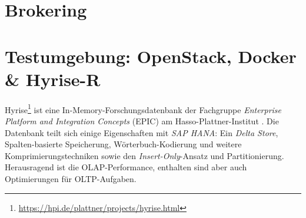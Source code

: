 \section{Brokering}



%
%
%
%
%
%
%


%
%
%
%
%

\section{Testumgebung: OpenStack, Docker \& Hyrise-R}

Hyrise\footnote{\url{https://hpi.de/plattner/projects/hyrise.html}} ist eine In-Memory-Forschungsdatenbank der Fachgruppe \emph{Enterprise Platform and Integration Concepts} (EPIC) am Hasso-Plattner-Institut \cite{grund:2010:hyrise}. Die Datenbank teilt sich einige Eigenschaften mit \emph{SAP HANA}: Ein \emph{Delta Store}, Spalten-basierte Speicherung, Wörterbuch-Kodierung und weitere Komprimierungstechniken sowie den \emph{Insert-Only}-Ansatz und Partitionierung. Herausragend ist die OLAP-Performance, enthalten sind aber auch Optimierungen für OLTP-Aufgaben.


